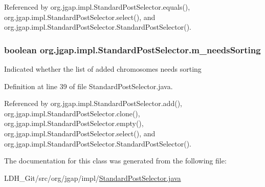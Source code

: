 Referenced by org.\-jgap.\-impl.\-Standard\-Post\-Selector.\-equals(), org.\-jgap.\-impl.\-Standard\-Post\-Selector.\-select(), and org.\-jgap.\-impl.\-Standard\-Post\-Selector.\-Standard\-Post\-Selector().

\hypertarget{classorg_1_1jgap_1_1impl_1_1_standard_post_selector_aed2e8ed51df6a2317a2be6cbd7b406e9}{
\subsubsection[{m\-\_\-needs\-Sorting}]{\setlength{\rightskip}{0pt plus 5cm}boolean org.\-jgap.\-impl.\-Standard\-Post\-Selector.\-m\-\_\-needs\-Sorting\hspace{0.3cm}{\ttfamily [private]}}}\label{classorg_1_1jgap_1_1impl_1_1_standard_post_selector_aed2e8ed51df6a2317a2be6cbd7b406e9}
Indicated whether the list of added chromosomes needs sorting 

Definition at line 39 of file Standard\-Post\-Selector.\-java.



Referenced by org.\-jgap.\-impl.\-Standard\-Post\-Selector.\-add(), org.\-jgap.\-impl.\-Standard\-Post\-Selector.\-clone(), org.\-jgap.\-impl.\-Standard\-Post\-Selector.\-empty(), org.\-jgap.\-impl.\-Standard\-Post\-Selector.\-select(), and org.\-jgap.\-impl.\-Standard\-Post\-Selector.\-Standard\-Post\-Selector().



The documentation for this class was generated from the following file\-:\begin{DoxyCompactItemize}
\item 
L\-D\-H\-\_\-\-Git/src/org/jgap/impl/\hyperlink{_standard_post_selector_8java}{Standard\-Post\-Selector.\-java}\end{DoxyCompactItemize}
